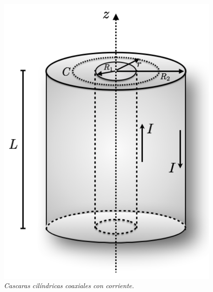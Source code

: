 \documentclass[11pt,fleqn]{book} %
\begin{document}
\begin{example}
\begin{figure}[hbtp]
\centering
\includegraphics[scale=0.45]{Pictures/cascaras-cilindricas-coaxiales-con-corriente.pdf}
\caption{\textit{Cascaras cil\'indricas coaxiales con corriente.}}
\end{figure}


\end{example}
\end{document}
